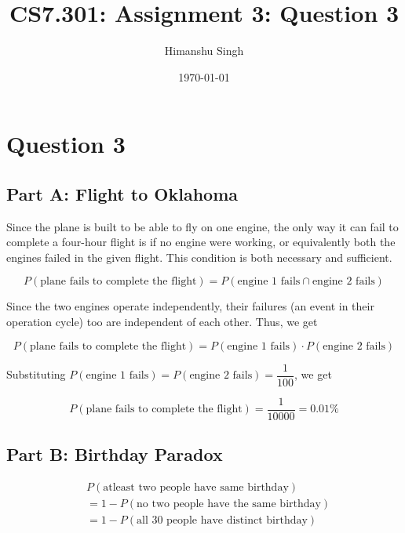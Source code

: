 \documentclass[a4paper, 12pt]{article}
\title{CS7.301: Assignment 3: Question 3}
\author{Himanshu Singh}
\date{\today}
\begin{document}
\section*{Question 3}

\subsection*{Part A: Flight to Oklahoma}

Since the plane is built to be able to fly on one engine, the only way it can fail to complete a four-hour flight is if no engine were working, or equivalently both the engines failed in the given flight. This condition is both necessary and sufficient.

\begin{equation}
P(\text{plane fails to complete the flight}) = P(\text{engine 1 fails} \cap \text{engine 2 fails})
\end{equation}

Since the two engines operate independently, their failures (an event in their operation cycle) too are independent of each other. Thus, we get

\begin{equation}
P(\text{plane fails to complete the flight}) = P(\text{engine 1 fails}) \cdot P(\text{engine 2 fails})
\end{equation}

Substituting $P(\text{engine 1 fails}) = P(\text{engine 2 fails}) = \dfrac{1}{100}$, we get

\begin{equation}
P(\text{plane fails to complete the flight}) = \dfrac{1}{10000} = 0.01\%
\end{equation}

\subsection*{Part B: Birthday Paradox}

\begin{fleqn}[\parindent]
\begin{equation}
\begin{split}
& P(\text{atleast two people have same birthday}) \\
&= 1 - P(\text{no two people have the same birthday}) \\
&= 1 - P(\text{all 30 people have distinct birthday}) \\
\end{split}
\end{equation}
\end{fleqn}
\end{document}
